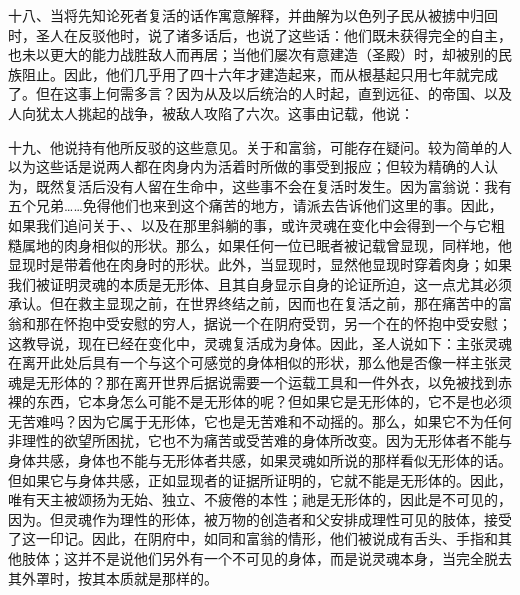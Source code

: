 十八、当将先知论死者复活的话作寓意解释，并曲解为以色列子民从被掳中归回时，圣人在反驳他时，说了诸多话后，也说了这些话：他们既未获得完全的自主，也未以更大的能力战胜敌人而再居；当他们屡次有意建造（圣殿）时，却被别的民族阻止。因此，他们几乎用了四十六年才建造起来，而从根基起只用七年就完成了。但在这事上何需多言？因为从及以后统治的人时起，直到远征、的帝国、以及人向犹太人挑起的战争，被敌人攻陷了六次。这事由记载，他说：\par

十九、他说持有他所反驳的这些意见。关于和富翁，可能存在疑问。较为简单的人以为这些话是说两人都在肉身内为活着时所做的事受到报应；但较为精确的人认为，既然复活后没有人留在生命中，这些事不会在复活时发生。因为富翁说：我有五个兄弟……免得他们也来到这个痛苦的地方，请派去告诉他们这里的事。因此，如果我们追问关于、、以及在那里斜躺的事，或许灵魂在变化中会得到一个与它粗糙属地的肉身相似的形状。那么，如果任何一位已眠者被记载曾显现，同样地，他显现时是带着他在肉身时的形状。此外，当显现时，显然他显现时穿着肉身；如果我们被证明灵魂的本质是无形体、且其自身显示自身的论证所迫，这一点尤其必须承认。但在救主显现之前，在世界终结之前，因而也在复活之前，那在痛苦中的富翁和那在怀抱中受安慰的穷人，据说一个在阴府受罚，另一个在的怀抱中受安慰；这教导说，现在已经在变化中，灵魂复活成为身体。因此，圣人说如下：主张灵魂在离开此处后具有一个与这个可感觉的身体相似的形状，那么他是否像一样主张灵魂是无形体的？那在离开世界后据说需要一个运载工具和一件外衣，以免被找到赤裸的东西，它本身怎么可能不是无形体的呢？但如果它是无形体的，它不是也必须无苦难吗？因为它属于无形体，它也是无苦难和不动摇的。那么，如果它不为任何非理性的欲望所困扰，它也不为痛苦或受苦难的身体所改变。因为无形体者不能与身体共感，身体也不能与无形体者共感，如果灵魂如所说的那样看似无形体的话。但如果它与身体共感，正如显现者的证据所证明的，它就不能是无形体的。因此，唯有天主被颂扬为无始、独立、不疲倦的本性；祂是无形体的，因此是不可见的，因为。但灵魂作为理性的形体，被万物的创造者和父安排成理性可见的肢体，接受了这一印记。因此，在阴府中，如同和富翁的情形，他们被说成有舌头、手指和其他肢体；这并不是说他们另外有一个不可见的身体，而是说灵魂本身，当完全脱去其外罩时，按其本质就是那样的。\par

